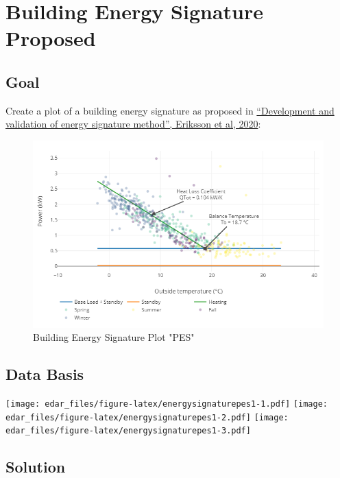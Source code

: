 \documentclass[
  a4paperpaper,
]{book}
\begin{document}
\newpage

\hypertarget{building-energy-signature-proposed}{%
\section{Building Energy Signature Proposed}\label{building-energy-signature-proposed}}

\hypertarget{goal-24}{%
\subsection{Goal}\label{goal-24}}

Create a plot of a building energy signature as proposed in \href{https://doi.org/10.1016/j.enbuild.2020.109756}{``Development and validation of energy signature method'', Eriksson et al, 2020}:

\begin{figure}
\includegraphics[width=0.7\linewidth]{images/plotBldgEngySigProposed} \caption{Building Energy Signature Plot "PES"}\label{fig:unnamed-chunk-35}
\end{figure}

\hypertarget{data-basis-24}{%
\subsection{Data Basis}\label{data-basis-24}}

\texttt{[image: edar\_files/figure-latex/energysignaturepes1-1.pdf]} \texttt{[image: edar\_files/figure-latex/energysignaturepes1-2.pdf]} \texttt{[image: edar\_files/figure-latex/energysignaturepes1-3.pdf]}

\newpage

\hypertarget{solution-24}{%
\subsection{Solution}\label{solution-24}}
\end{document}
